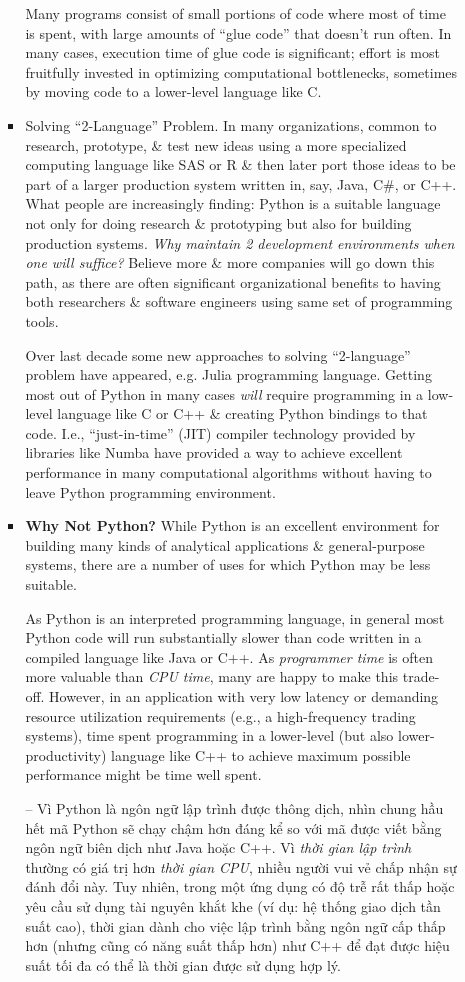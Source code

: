 \documentclass{article}
\begin{document}
\begin{itemize}
\begin{itemize}
\begin{itemize}
			Many programs consist of small portions of code where most of time is spent, with large amounts of ``glue code'' that doesn't run often. In many cases, execution time of glue code is significant; effort is most fruitfully invested in optimizing computational bottlenecks, sometimes by moving code to a lower-level language like C.
			\item {\sf Solving ``2-Language'' Problem.} In many organizations, common to research, prototype, \& test new ideas using a more specialized computing language like SAS or R \& then later port those ideas to be part of a larger production system written in, say, Java, C\#, or C++. What people are increasingly finding: Python is a suitable language not only for doing research \& prototyping but also for building production systems. {\it Why maintain 2 development environments when one will suffice?} Believe more \& more companies will go down this path, as there are often significant organizational benefits to having both researchers \& software engineers using same set of programming tools.
			
			Over last decade some new approaches to solving ``2-language'' problem have appeared, e.g. Julia programming language. Getting most out of Python in many cases {\it will} require programming in a low-level language like C or C++ \& creating Python bindings to that code. I.e., ``just-in-time'' (JIT) compiler technology provided by libraries like Numba have provided a way to achieve excellent performance in many computational algorithms without having to leave Python programming environment.
			\item {\bf Why Not Python?} While Python is an excellent environment for building many kinds of analytical applications \& general-purpose systems, there are a number of uses for which Python may be less suitable.
			
			As Python is an interpreted programming language, in general most Python code will run substantially slower than code written in a compiled language like Java or C++. As {\it programmer time} is often more valuable than {\it CPU time}, many are happy to make this trade-off. However, in an application with very low latency or demanding resource utilization requirements (e.g., a high-frequency trading systems), time spent programming in a lower-level (but also lower-productivity) language like C++ to achieve maximum possible performance might be time well spent.
			
			-- Vì Python là ngôn ngữ lập trình được thông dịch, nhìn chung hầu hết mã Python sẽ chạy chậm hơn đáng kể so với mã được viết bằng ngôn ngữ biên dịch như Java hoặc C++. Vì {\it thời gian lập trình} thường có giá trị hơn {\it thời gian CPU}, nhiều người vui vẻ chấp nhận sự đánh đổi này. Tuy nhiên, trong một ứng dụng có độ trễ rất thấp hoặc yêu cầu sử dụng tài nguyên khắt khe (ví dụ: hệ thống giao dịch tần suất cao), thời gian dành cho việc lập trình bằng ngôn ngữ cấp thấp hơn (nhưng cũng có năng suất thấp hơn) như C++ để đạt được hiệu suất tối đa có thể là thời gian được sử dụng hợp lý.
			

\end{itemize}
\end{itemize}
\end{itemize}
\end{document}
